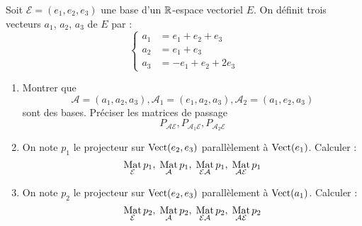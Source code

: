 Soit $\mathcal{E}=(e_1,e_2,e_3)$ une base d'un $\mathbb{R}$-espace vectoriel $E$. On définit trois vecteurs $a_1$, $a_2$, $a_3$ de $E$ par :
\begin{displaymath}
\left\lbrace
\begin{aligned}
a_1 &= e_1 + e_2 + e_3 \\
a_2 &= e_1  + e_3 \\
a_3 &= -e_1 + e_2 + 2e_3
 \end{aligned}
\right. 
\end{displaymath}

\begin{enumerate}
\item Montrer que 
\[\mathcal{A}=(a_1,a_2,a_3), \mathcal{A}_1=(e_1,a_2,a_3), \mathcal{A}_2=(a_1,e_2,a_3)\]
sont des bases. Préciser les matrices de passage 
\[P_{\mathcal{A E}}, P_{\mathcal{A}_1\mathcal{E}}, P_{\mathcal{A}_2\mathcal{E}} \]

\item On note $p_1$ le projecteur sur $\operatorname{Vect} (e_2,e_3)$ parallèlement à $\operatorname{Vect} (e_1)$. Calculer :
\[
\underset{\mathcal{E}}{\operatorname{Mat}}\, p_1,\;
\underset{\mathcal{A}}{\operatorname{Mat}}\, p_1, \;
\underset{\mathcal{E A}}{\operatorname{Mat}}\, p_1,\;
\underset{\mathcal{A E}}{\operatorname{Mat}}\, p_1 \] 

\item On note $p_2$ le projecteur sur $\operatorname{Vect} (e_2,e_3)$ parallèlement à $\operatorname{Vect} (a_1)$. Calculer :
\[
\underset{\mathcal{E}}{\operatorname{Mat}}\, p_2,\;
\underset{\mathcal{A}}{\operatorname{Mat}}\, p_2, \;
\underset{\mathcal{E A}}{\operatorname{Mat}}\, p_2, \;
\underset{\mathcal{A E}}{\operatorname{Mat}}\, p_2
\] 


\end{enumerate}